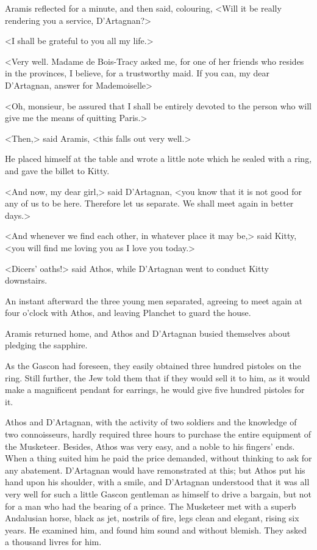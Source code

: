 Aramis reflected for a minute, and then said, colouring, <Will it be really rendering you a service, D'Artagnan?> 

<I shall be grateful to you all my life.> 

<Very well. Madame de Bois-Tracy asked me, for one of her friends who resides in the provinces, I believe, for a trustworthy maid. If you can, my dear D'Artagnan, answer for Mademoiselle\longdash> 

<Oh, monsieur, be assured that I shall be entirely devoted to the person who will give me the means of quitting Paris.> 

<Then,> said Aramis, <this falls out very well.> 

He placed himself at the table and wrote a little note which he sealed with a ring, and gave the billet to Kitty. 

<And now, my dear girl,> said D'Artagnan, <you know that it is not good for any of us to be here. Therefore let us separate. We shall meet again in better days.> 

<And whenever we find each other, in whatever place it may be,> said Kitty, <you will find me loving you as I love you today.> 

<Dicers' oaths!> said Athos, while D'Artagnan went to conduct Kitty downstairs. 

An instant afterward the three young men separated, agreeing to meet again at four o'clock with Athos, and leaving Planchet to guard the house. 

Aramis returned home, and Athos and D'Artagnan busied themselves about pledging the sapphire. 

As the Gascon had foreseen, they easily obtained three hundred pistoles on the ring. Still further, the Jew told them that if they would sell it to him, as it would make a magnificent pendant for earrings, he would give five hundred pistoles for it. 

Athos and D'Artagnan, with the activity of two soldiers and the knowledge of two connoisseurs, hardly required three hours to purchase the entire equipment of the Musketeer. Besides, Athos was very easy, and a noble to his fingers' ends. When a thing suited him he paid the price demanded, without thinking to ask for any abatement. D'Artagnan would have remonstrated at this; but Athos put his hand upon his shoulder, with a smile, and D'Artagnan understood that it was all very well for such a little Gascon gentleman as himself to drive a bargain, but not for a man who had the bearing of a prince. The Musketeer met with a superb Andalusian horse, black as jet, nostrils of fire, legs clean and elegant, rising six years. He examined him, and found him sound and without blemish. They asked a thousand livres for him. 

